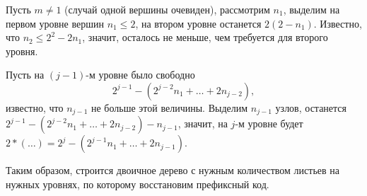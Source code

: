 Пусть $m \neq 1$ (случай одной вершины очевиден), рассмотрим $n_{1}$, выделим на первом уровне вершин $n_{1} \leqslant 2$, на втором уровне останется $2(2 - n_{1})$. Известно, что $n_{2} \leqslant 2^{2} - 2n_{1}$, значит, осталось не меньше, чем требуется для второго уровня.

Пусть на $(j-1)$-м уровне было свободно $$2^{j-1} - (2^{j-2} n_{1} +\ldots + 2 n_{j-2}),$$ известно, что $n_{j-1}$ не больше этой величины. Выделим $n_{j-1}$ узлов, останется $2^{j-1} - (2^{j-2} n_{1} +\ldots + 2 n_{j-2}) - n_{j-1}$, значит, на $j$-м уровне будет $2*(\ldots) =2^{j} - (2^{j-1}n_{1} +\ldots + 2 n_{j-1})$.

Таким образом, строится двоичное дерево с нужным количеством листьев на нужных уровнях, по которому восстановим префиксный код.